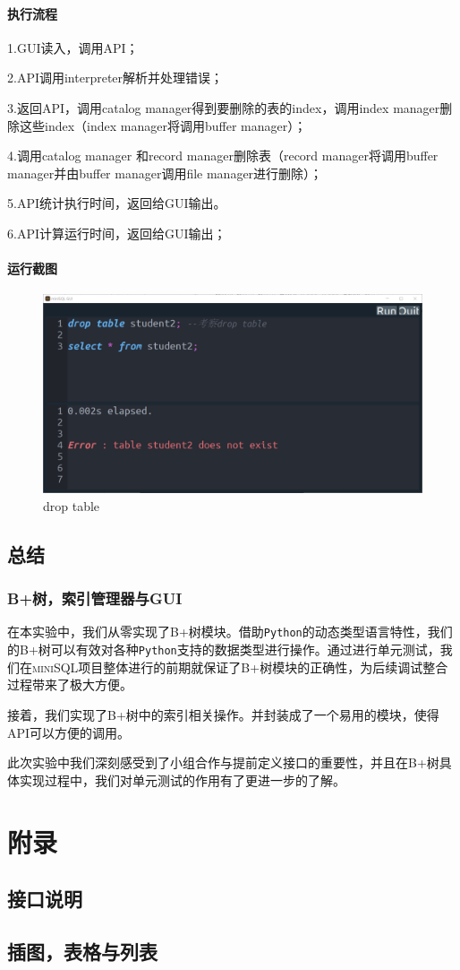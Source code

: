 \documentclass[UTF8]{ctexrep} %
\begin{document}
\subsection{执行流程}
1.GUI读入，调用API；
\par
2.API调用interpreter解析并处理错误；
\par
3.返回API，调用catalog manager得到要删除的表的index，调用index manager删除这些index（index manager将调用buffer manager）；
\par
4.调用catalog manager 和record manager删除表（record manager将调用buffer manager并由buffer manager调用file manager进行删除）；
\par
5.API统计执行时间，返回给GUI输出。
\par
6.API计算运行时间，返回给GUI输出；
\subsection{运行截图}
\begin{figure}[H]
    \centering
    \includegraphics[width=0.8\linewidth]{figure/2.1.png}
    \caption{drop table}
    \label{fig:runtime1.1}
\end{figure}


\chapter{总结}
\section{B+树，索引管理器与GUI}
在本实验中，我们从零实现了B+树模块。借助\texttt{Python}的动态类型语言特性，我们的B+树可以有效对各种\texttt{Python}支持的数据类型进行操作。通过进行单元测试，我们在\textsc{miniSQL}项目整体进行的前期就保证了B+树模块的正确性，为后续调试整合过程带来了极大方便。
\par
接着，我们实现了B+树中的索引相关操作。并封装成了一个易用的模块，使得API可以方便的调用。
\par
此次实验中我们深刻感受到了小组合作与提前定义接口的重要性，并且在B+树具体实现过程中，我们对单元测试的作用有了更进一步的了解。


\newpage
\part{附录}


\begin{appendices}
\chapter{接口说明}

\chapter{插图，表格与列表}
\listoffigures
\listoflistings
\end{appendices}
\end{document}
